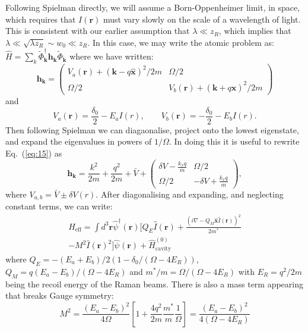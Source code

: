 \documentclass[twocolumn]{revtex4-1}
\renewcommand{\vec}[1]{\mathbf{#1}}
\begin{document}
Following Spielman directly, we will assume a Born-Oppenheimer limit,
in space, which requires that $I(\vec{r})$ must vary slowly on the
scale of a wavelength of light.  This is consistent with our earlier
assumption that $\lambda \ll z_R$, which implies that $\lambda \ll
\sqrt{\lambda z_R} \sim w_0 \ll z_R$.  In this case, we may
write the atomic problem as:
\begin{math}
  \hat{H} = \sum_k 
  \tilde{\Phi}^\dagger_{\vec{k}}
  \vec{h}_{\vec{k}}
  \tilde{\Phi}^{}_{\vec{k}}
\end{math}
where we have written:
\begin{equation}
  \label{eq:15}
  \vec{h}_{\vec{k}} =
  \begin{pmatrix}
    V_a(\vec{r}) + (\vec{k} - q \hat{\vec{x}})^2/2m & \Omega/2 \\ 
    \Omega/2 & V_b(\vec{r}) + (\vec{k} + q \hat{\vec{x}})^2/2m
  \end{pmatrix}
\end{equation}
and
\begin{displaymath}
  V_a(\vec{r}) =\frac{\delta_0}{2} - E_a I(r), \qquad
  V_b(\vec{r}) =-\frac{\delta_0}{2} - E_b I(r).
\end{displaymath}
Then following Spielman we can diagaonalise, project onto
the lowest eigenstate, and expand the eigenvalues in powers
of $1/\Omega$.   In doing this it is useful to rewrite Eq.~(\ref{eq:15}) 
as
\begin{equation}
\label{eq:16}
  \vec{h}_{\vec{k}} =
  \frac{k^2}{2m} + \frac{q^2}{2m}
  + \bar{V}+
  \begin{pmatrix}
    \delta V - \frac{k_x q}{m}
    & \Omega/2 \\ 
    \Omega/2 & 
    -\delta V + \frac{k_x q}{m}
  \end{pmatrix},
\end{equation}
where $V_{a,b} = \bar{V} \pm \delta V(r)$.  After diagonalising and
expanding, and neglecting constant terms, we can write:
\begin{multline}
  \label{eq:17}
  H_{\text{eff}} 
  =
  \int d^3\vec{r}
  \hat{\psi}^\dagger(\vec{r})
  \Biggl[
    Q_E \hat{I}(\vec{r})
    +
    \frac{\left(i \nabla - Q_M \hat{\vec{x}} \hat{I}(\vec{r}) \right)^2}{2m^\ast} 
    \\
    - M^2 \hat{I}(\vec{r})^2
  \Biggr]
  \hat{\psi}^{}(\vec{r})
  + \hat{H}^{(0)}_{\text{cavity}}
\end{multline}
where $Q_E = - (E_a+E_b)/2\left(1-\delta_0/\left(\Omega-4E_R\right)\right)$, $Q_M = q (E_a - E_b) / (\Omega - 4 E_R)$
and $m^\ast/m =  \Omega/(\Omega - 4 E_R)$ with $E_R=q^2/2m$ being the
recoil energy of the Raman beams.   There is also a  mass term
appearing that breaks Gauge symmetry:
\begin{displaymath}
  M^2 = 
   \frac{(E_a-E_b)^2}{4\Omega}
  \left[
    1 + \frac{4 q^2}{2m} \frac{m^\ast}{m} \frac{1}{\Omega}
  \right]
  =
   \frac{(E_a-E_b)^2}{4(\Omega-4E_R)}
\end{displaymath}
\end{document}
